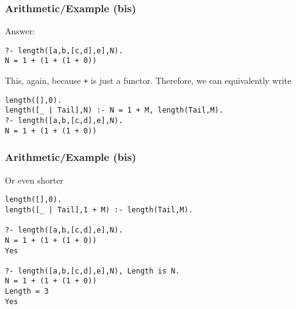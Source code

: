%
\begin{frame}[containsverbatim]
\frametitle{Arithmetic/Example (bis)}

Answer:
{\small
\begin{verbatim}
?- length([a,b,[c,d],e],N).
N = 1 + (1 + (1 + 0))
\end{verbatim}
}
This, again, because \texttt{+} is just a functor. Therefore, we can
equivalently write
{\small
\begin{verbatim}
length([],0).
length([_ | Tail],N) :- N = 1 + M, length(Tail,M).
?- length([a,b,[c,d],e],N).
N = 1 + (1 + (1 + 0))
\end{verbatim}
}

\end{frame}

%
\begin{frame}[containsverbatim]
\frametitle{Arithmetic/Example (bis)}

Or even shorter
{\small
\begin{verbatim}
length([],0).
length([_ | Tail],1 + M) :- length(Tail,M).

?- length([a,b,[c,d],e],N).
N = 1 + (1 + (1 + 0))
Yes

?- length([a,b,[c,d],e],N), Length is N.
N = 1 + (1 + (1 + 0))
Length = 3
Yes
\end{verbatim}
}

\end{frame}
